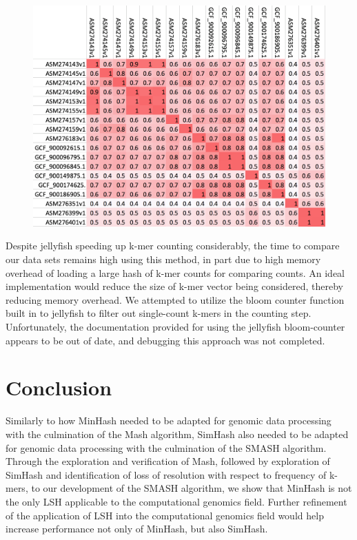 \documentclass[12pt, letterpaper]{article}
\begin{document}
\begin{figure}[h]
	\centering
	\includegraphics[width=1.0\textwidth]{smashtable.png}
\end{figure}
\FloatBarrier
Despite jellyfish speeding up k-mer counting considerably, the time to compare our data sets remains high using this method, in part due to high memory overhead of loading a large hash of k-mer counts for comparing counts. An ideal implementation would reduce the size of k-mer vector being considered, thereby reducing memory overhead. We attempted to utilize the bloom counter function built in to jellyfish to filter out single-count k-mers in the counting step. Unfortunately, the documentation provided for using the jellyfish bloom-counter appears to be out of date, and debugging this approach was not completed.

\section{Conclusion}
Similarly to how MinHash needed to be adapted for genomic data processing with the culmination of the Mash algorithm, SimHash also needed to be adapted for genomic data processing with the culmination of the SMASH algorithm. Through the exploration and verification of Mash, followed by exploration of SimHash and identification of loss of resolution with respect to frequency of k-mers, to our development of the SMASH algorithm, we show that MinHash is not the only LSH applicable to the computational genomics field. Further refinement of the application of LSH into the computational genomics field would help increase performance not only of MinHash, but also SimHash.
\end{document}
